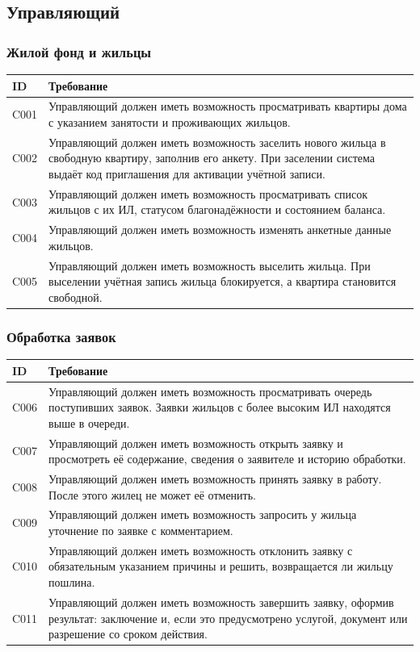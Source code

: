 \documentclass[12pt,a4paper]{article}
\newenvironment{reqtable}{%
  \begin{longtable}{L{14mm} L{146mm}}
  \toprule
  \textbf{ID} & \textbf{Требование} \\
  \midrule
  \endhead
  \bottomrule
  \endfoot
}{\end{longtable}}
\begin{document}
\subsection{Управляющий}

\subsubsection*{Жилой фонд и жильцы}
\begin{reqtable}
C001 & Управляющий должен иметь возможность просматривать квартиры дома с указанием занятости и проживающих жильцов. \\
C002 & Управляющий должен иметь возможность заселить нового жильца в свободную квартиру, заполнив его анкету. При заселении система выдаёт код приглашения для активации учётной записи. \\
C003 & Управляющий должен иметь возможность просматривать список жильцов с их ИЛ, статусом благонадёжности и состоянием баланса. \\
C004 & Управляющий должен иметь возможность изменять анкетные данные жильцов. \\
C005 & Управляющий должен иметь возможность выселить жильца. При выселении учётная запись жильца блокируется, а квартира становится свободной. \\
\end{reqtable}

\subsubsection*{Обработка заявок}
\begin{reqtable}
C006 & Управляющий должен иметь возможность просматривать очередь поступивших заявок. Заявки жильцов с более высоким ИЛ находятся выше в очереди. \\
C007 & Управляющий должен иметь возможность открыть заявку и просмотреть её содержание, сведения о заявителе и историю обработки. \\
C008 & Управляющий должен иметь возможность принять заявку в работу. После этого жилец не может её отменить. \\
C009 & Управляющий должен иметь возможность запросить у жильца уточнение по заявке с комментарием. \\
C010 & Управляющий должен иметь возможность отклонить заявку с обязательным указанием причины и решить, возвращается ли жильцу пошлина. \\
C011 & Управляющий должен иметь возможность завершить заявку, оформив результат: заключение и, если это предусмотрено услугой, документ или разрешение со сроком действия. \\
\end{reqtable}
\end{document}
